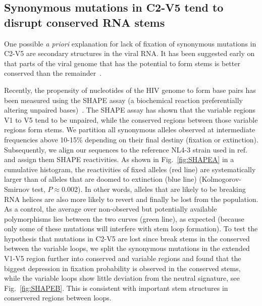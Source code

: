 \documentclass[rmp, twocolumn]{revtex4}
\newcommand{\FIG}[1]{Fig.~\ref{fig:#1}}
\begin{document}
\subsection{Synonymous mutations in C2-V5 tend to disrupt conserved RNA stems}

One possible {\it a priori} explanation for lack of fixation of synonymous
mutations in C2-V5 are  secondary structures in the viral RNA. It has
been suggested early on that parts of the viral genome that has the potential to
form stems is better conserved than the
remainder~\citep{forsdyke_reciprocal_1995,snoeck_mapping_2011}.

Recently, the propensity of nucleotides of the HIV genome to form base pairs has
been measured using the SHAPE assay (a biochemical reaction preferentially
altering unpaired bases)~\citep{watts_architecture_2009}. The SHAPE assay has
shown that the variable regions V1 to V5 tend to be unpaired, while the
conserved regions between those variable regions form stems. We partition all
synonymous alleles observed at intermediate frequencies above 10-15\% depending
on their final destiny (fixation or extinction). Subsequently, we align our
sequences to the reference NL4-3 strain used in
ref.~\citep{watts_architecture_2009} and assign them SHAPE reactivities. As
shown in \FIG{SHAPEA} in a cumulative histogram, the reactivities of fixed
alleles (red line) are systematically larger than of alleles that are doomed to
extinction (blue line) (Kolmogorov-Smirnov test, $P\approx 0.002$).
In other words, alleles that are likely to be
breaking RNA helices are also more likely to revert and finally be lost from the
population. As a control, the average over non-observed but potentially
available polymorphisms lies between the two curves (green line), as expected
(because only some of these mutations will interfere with stem loop formation).
To test the hypothesis that mutations in C2-V5 are lost since break stems
in the conserved between the variable loops, we split the synonymous mutations
in the extended V1-V5 region further into conserved and variable regions and
found that the biggest depression in fixation probability is observed in the
conserved stems, while the variable loops show little deviation from the
neutral signature, see \FIG{SHAPEB}. This is consistent with important stem
structures in conservered regions between loops.
\end{document}
